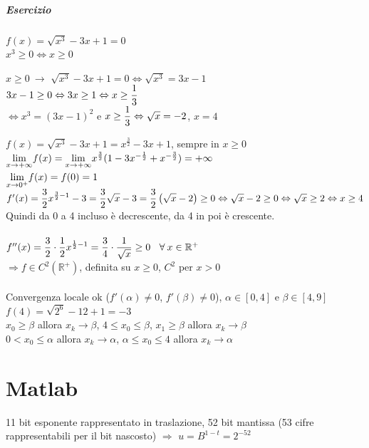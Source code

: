 \documentclass[10pt]{book}
\begin{document}
\paragraph{Esercizio} $f(x) = \sqrt{x^3} - 3x + 1 = 0$\\
$x^3 \geq 0 \Leftrightarrow x \geq 0$
\begin{list}{}{}
	\item[$x\geq0\:\rightarrow$] $\sqrt{x^3} - 3x + 1 = 0 \Leftrightarrow \sqrt{x^3} = 3x - 1$\\
	$3x - 1 \geq 0 \Leftrightarrow 3x \geq 1 \Leftrightarrow x \geq \mathlarger{\frac{1}{3}}$\\
	$\Leftrightarrow x^3 = (3x - 1)^2$ e $x \geq \mathlarger{\frac{1}{3}} \Leftrightarrow \sqrt{x} = -2$, $x = 4$
\end{list}
$f(x) = \sqrt{x^3} - 3x + 1 = x^{\frac{3}{2}} - 3x + 1$, sempre in $x\geq 0$\\
$\mathlarger{\lim_{x\to+\infty}} f(x) = \mathlarger{\lim_{x\to+\infty}}x^{\frac{3}{2}}(1 - 3x^{-\frac{1}{2}} + x^{-\frac{3}{2}}) = +\infty$\\
$\mathlarger{\lim_{x\to 0^+}} f(x) = f(0) = 1$\\
$f'(x) = \mathlarger{\frac{3}{2}x^{\frac{3}{2} - 1} - 3} = \mathlarger{\frac{3}{2}\sqrt{x} - 3} = \mathlarger{\frac{3}{2}\left(\sqrt{x} - 2 \right)} \geq 0 \Leftrightarrow \sqrt{x} - 2 \geq 0 \Leftrightarrow \sqrt{x} \geq 2 \Leftrightarrow x \geq 4$\\
Quindi da 0 a 4 incluso è decrescente, da 4 in poi è crescente.\\\\
$f''(x) = \mathlarger{\frac{3}{2}\cdot\frac{1}{2} x^{\frac{1}{2} - 1}} = \mathlarger{\frac{3}{4}\cdot\frac{1}{\sqrt{x}}} \geq 0\:\:\:\:\forall\:x\in\mathbb{R}^+$\\
$\Rightarrow f\in C^2(\mathbb{R}^+)$, definita su $x\geq 0$, $C^2$ per $x > 0$\\\\
Convergenza locale ok ($f'(\alpha) \neq 0$, $f'(\beta) \neq 0$), $\alpha\in[0, 4]$ e $\beta\in[4, 9]$\\
$f(4) = \sqrt{2^6} - 12 + 1 = -3$\\
$x_0 \geq \beta$ allora $x_k \longrightarrow \beta$, $4 \leq x_0 \leq \beta$, $x_1 \geq \beta$ allora $x_k \longrightarrow \beta$\\
$0 < x_0 \leq \alpha$ allora $x_k \longrightarrow \alpha$, $\alpha \leq x_0 \leq 4$ allora $x_k \longrightarrow \alpha$
\chapter{Matlab}
11 bit esponente rappresentato in traslazione, 52 bit mantissa (53 cifre rappresentabili per il bit nascosto) $\Rightarrow$ $u = B^{1-t} = 2^{-52}$
\end{document}

